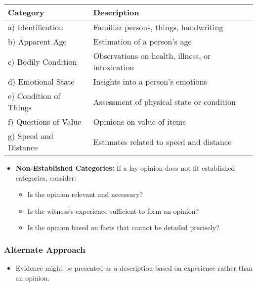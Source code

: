 \begin{longtable}[]{@{}
  >{\raggedright\arraybackslash}p{}
  >{\raggedright\arraybackslash}p{}@{}}
\toprule\noalign{}
\begin{minipage}[b]{\linewidth}\raggedright
Category
\end{minipage} & \begin{minipage}[b]{\linewidth}\raggedright
Description
\end{minipage} \\
\midrule\noalign{}
\endhead
\bottomrule\noalign{}
\endlastfoot
a) Identification & Familiar persons, things, handwriting \\
b) Apparent Age & Estimation of a person's age \\
c) Bodily Condition & Observations on health, illness, or
intoxication \\
d) Emotional State & Insights into a person's emotions \\
e) Condition of Things & Assessment of physical state or condition \\
f) Questions of Value & Opinions on value of items \\
g) Speed and Distance & Estimates related to speed and distance \\
\end{longtable}

\begin{itemize}
\tightlist
\item
  \textbf{Non-Established Categories:} If a lay opinion does not fit
  established categories, consider:

  \begin{itemize}
  \tightlist
  \item
    Is the opinion relevant and necessary?
  \item
    Is the witness's experience sufficient to form an opinion?
  \item
    Is the opinion based on facts that cannot be detailed precisely?
  \end{itemize}
\end{itemize}

\subsubsection{Alternate Approach}\label{alternate-approach}

\begin{itemize}
\tightlist
\item
  Evidence might be presented as a description based on experience
  rather than an opinion.
\end{itemize}

